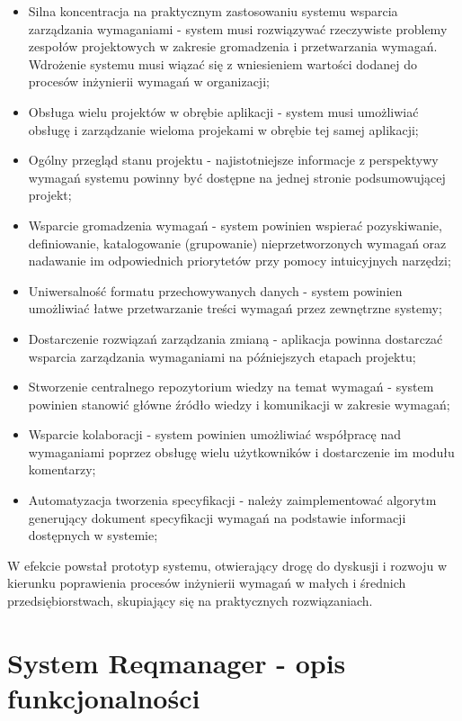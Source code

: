     \begin{itemize}
      \item Silna koncentracja na praktycznym zastosowaniu systemu wsparcia zarządzania wymaganiami - system musi rozwiązywać rzeczywiste problemy zespołów projektowych w zakresie gromadzenia i przetwarzania wymagań. Wdrożenie systemu musi wiązać się z wniesieniem wartości dodanej do procesów inżynierii wymagań w organizacji;
      \item Obsługa wielu projektów w obrębie aplikacji - system musi umożliwiać obsługę i zarządzanie wieloma projekami w obrębie tej samej aplikacji;
      \item Ogólny przegląd stanu projektu - najistotniejsze informacje z perspektywy wymagań systemu powinny być dostępne na jednej stronie podsumowującej projekt;
      \item Wsparcie gromadzenia wymagań - system powinien wspierać pozyskiwanie, definiowanie, katalogowanie (grupowanie) nieprzetworzonych wymagań oraz nadawanie im odpowiednich priorytetów przy pomocy intuicyjnych narzędzi;
      \item Uniwersalność formatu przechowywanych danych - system powinien umożliwiać łatwe przetwarzanie treści wymagań przez zewnętrzne systemy;
      \item Dostarczenie rozwiązań zarządzania zmianą - aplikacja powinna dostarczać wsparcia zarządzania wymaganiami na późniejszych etapach projektu;
      \item Stworzenie centralnego repozytorium wiedzy na temat wymagań - system powinien stanowić główne źródło wiedzy i komunikacji w zakresie wymagań;
      \item Wsparcie kolaboracji - system powinien umożliwiać współpracę nad wymaganiami poprzez obsługę wielu użytkowników i dostarczenie im modułu komentarzy;
      \item Automatyzacja tworzenia specyfikacji - należy zaimplementować algorytm generujący dokument specyfikacji wymagań na podstawie informacji dostępnych w systemie;
    \end{itemize}

    W efekcie powstał prototyp systemu, otwierający drogę do dyskusji i rozwoju w kierunku poprawienia procesów inżynierii wymagań w małych i średnich przedsiębiorstwach, skupiający się na praktycznych rozwiązaniach. 

  \section{System Reqmanager - opis funkcjonalności}

